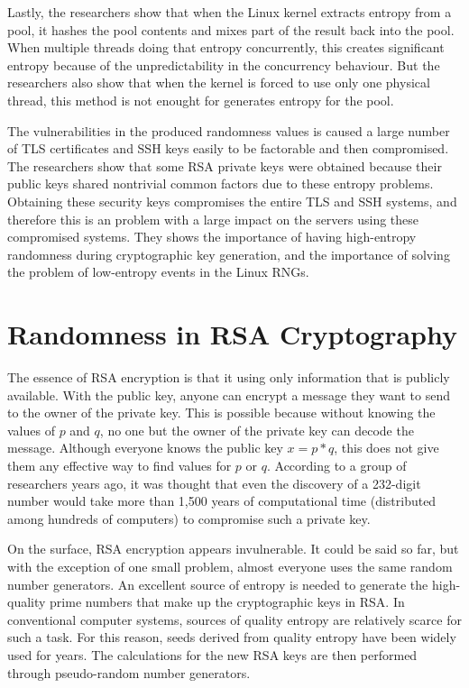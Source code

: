 \documentclass[runningheads]{llncs}
\begin{document}
Lastly, the researchers show that when the Linux kernel extracts entropy from a pool, it hashes the pool contents and mixes part of the result back into the pool. When multiple threads doing that entropy concurrently, this creates significant entropy because of the unpredictability in the concurrency behaviour. But the researchers also show that when the kernel is forced to use only one physical thread, this method is not enought for generates entropy for the pool.

The vulnerabilities in the produced randomness values is caused a large number of TLS certificates and SSH keys easily to be factorable and then compromised. The researchers show that some RSA private keys were obtained because their public keys shared nontrivial common factors due to these entropy problems. Obtaining these security keys compromises the entire TLS and SSH systems, and therefore this is an problem with a large impact on the servers using these compromised systems. They shows the importance of having high-entropy randomness during cryptographic key generation, and the importance of solving the problem of low-entropy events in the Linux RNGs.

\section{Randomness in RSA Cryptography}
\label{sec:3}

The essence of RSA encryption is that it using only information that is publicly available. With the public key, anyone can encrypt a message they want to send to the owner of the private key. This is possible because without knowing the values of $p$ and $q$, no one but the owner of the private key can decode the message. Although everyone knows the public key $x = p * q$, this does not give them any effective way to find values for $p$ or $q$. According to a group of researchers years ago, it was thought that even the discovery of a 232-digit number would take more than 1,500 years of computational time (distributed among hundreds of computers) to compromise such a private key. 

On the surface, RSA encryption appears invulnerable. It could be said so far, but with the exception of one small problem, almost everyone uses the same random number generators. An excellent source of entropy is needed to generate the high-quality prime numbers that make up the cryptographic keys in RSA. In conventional computer systems, sources of quality entropy are relatively scarce for such a task. For this reason, seeds derived from quality entropy have been widely used for years. The calculations for the new RSA keys are then performed through pseudo-random number generators. 
\end{document}
